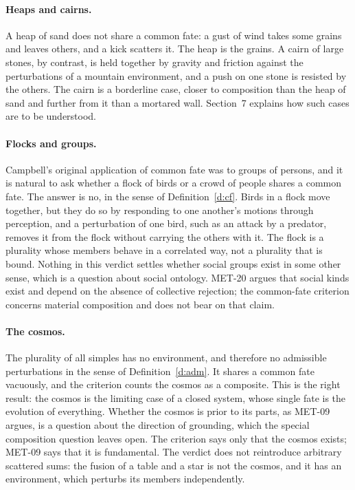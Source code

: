 \documentclass{situationist-preprint}
\begin{document}
\paragraph{Heaps and cairns.} A heap of sand does not share a common fate: a gust of wind takes some grains and leaves others, and a kick scatters it. The heap is the grains. A cairn of large stones, by contrast, is held together by gravity and friction against the perturbations of a mountain environment, and a push on one stone is resisted by the others. The cairn is a borderline case, closer to composition than the heap of sand and further from it than a mortared wall. Section~7 explains how such cases are to be understood.

\paragraph{Flocks and groups.} Campbell's original application of common fate was to groups of persons, and it is natural to ask whether a flock of birds or a crowd of people shares a common fate. The answer is no, in the sense of Definition~\ref{d:cf}. Birds in a flock move together, but they do so by responding to one another's motions through perception, and a perturbation of one bird, such as an attack by a predator, removes it from the flock without carrying the others with it. The flock is a plurality whose members behave in a correlated way, not a plurality that is bound. Nothing in this verdict settles whether social groups exist in some other sense, which is a question about social ontology. MET-20 argues that social kinds exist and depend on the absence of collective rejection; the common-fate criterion concerns material composition and does not bear on that claim.

\paragraph{The cosmos.} The plurality of all simples has no environment, and therefore no admissible perturbations in the sense of Definition~\ref{d:adm}. It shares a common fate vacuously, and the criterion counts the cosmos as a composite. This is the right result: the cosmos is the limiting case of a closed system, whose single fate is the evolution of everything. Whether the cosmos is prior to its parts, as MET-09 argues, is a question about the direction of grounding, which the special composition question leaves open. The criterion says only that the cosmos exists; MET-09 says that it is fundamental. The verdict does not reintroduce arbitrary scattered sums: the fusion of a table and a star is not the cosmos, and it has an environment, which perturbs its members independently.
\end{document}
